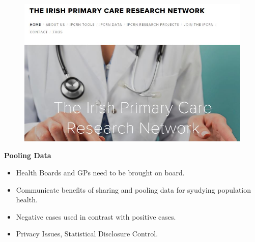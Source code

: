 \documentclass{beamer}
\begin{document}
	\begin{frame}
		
		\begin{figure}
\centering
\includegraphics[width=1.19\linewidth]{irishprimarycarenetwork}


\end{figure}

	\end{frame}	
		\begin{frame}
			\Large
			\textbf{Pooling Data}
			\begin{itemize}
				\item Health Boards and GPs need to be brought on board.
				\item Communicate benefits of sharing and pooling data for syudying population health.
				\item Negative cases used in contrast with positive cases.
				\item Privacy Issues, Statistical Disclosure Control.
			\end{itemize}
		\end{frame}
\end{document}
